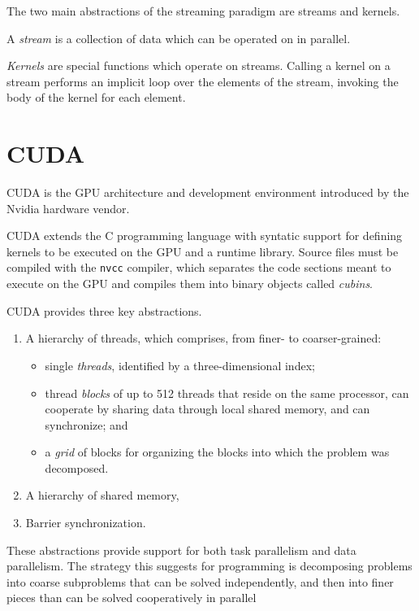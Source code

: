 The two main abstractions of the streaming paradigm are streams and kernels.

A \emph{stream} is a collection of data which can be operated on in parallel.

\emph{Kernels} are special functions which operate on streams.
Calling a kernel on a stream
performs an implicit loop over the elements of the stream,
invoking the body of the kernel for each element.


\section{CUDA}

CUDA is the GPU architecture and development environment
introduced by the Nvidia hardware vendor.

CUDA extends the C programming language
with syntatic support for defining kernels
to be executed on the GPU
and a runtime library.
Source files must be compiled with the \texttt{nvcc} compiler,
which separates the code sections meant to execute on the GPU
and compiles them into binary objects called \emph{cubins}.

CUDA provides three key abstractions.
\begin{enumerate}
  \item A hierarchy of threads,
    which comprises, from finer- to coarser-grained:
    \begin{itemize}
        \item single \emph{threads},
          identified by a three-dimensional index;
        \item thread \emph{blocks}
          of up to 512 threads
          that reside on the same processor,
          can cooperate by sharing data
          through local shared memory,
          and can synchronize; and
        \item a \emph{grid} of blocks
          for organizing the blocks
          into which the problem was decomposed.
    \end{itemize}
  \item A hierarchy of shared memory,
  \item Barrier synchronization.
\end{enumerate}
These abstractions provide
support for both task parallelism and data parallelism.
The strategy this suggests for programming
is decomposing problems into coarse subproblems
that can be solved independently,
and then into finer pieces
than can be solved cooperatively in parallel~\cite[\S1.1]{cudaprog2}











